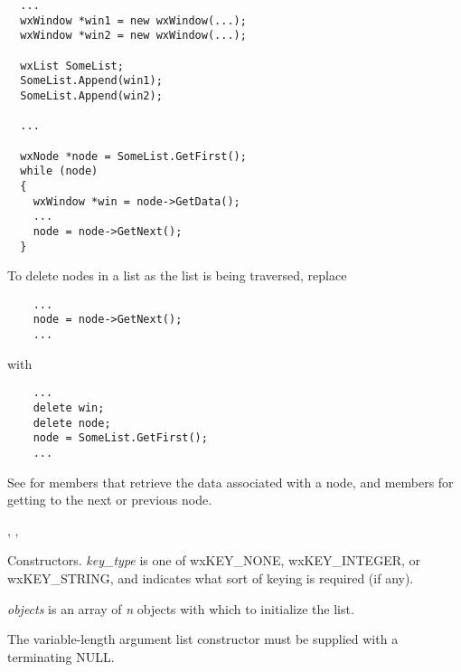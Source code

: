 \begin{verbatim}
  ...
  wxWindow *win1 = new wxWindow(...);
  wxWindow *win2 = new wxWindow(...);

  wxList SomeList;
  SomeList.Append(win1);
  SomeList.Append(win2);

  ...

  wxNode *node = SomeList.GetFirst();
  while (node)
  {
    wxWindow *win = node->GetData();
    ...
    node = node->GetNext();
  }
\end{verbatim}

To delete nodes in a list as the list is being traversed, replace

\begin{verbatim}
    ...
    node = node->GetNext();
    ...
\end{verbatim}

with

\begin{verbatim}
    ...
    delete win;
    delete node;
    node = SomeList.GetFirst();
    ...
\end{verbatim}

See  for members that retrieve the data associated with a node, and
members for getting to the next or previous node.


, ,







Constructors. {\it key\_type} is one of wxKEY\_NONE, wxKEY\_INTEGER, or wxKEY\_STRING,
and indicates what sort of keying is required (if any).

{\it objects} is an array of {\it n} objects with which to initialize the list.

The variable-length argument list constructor must be supplied with a
terminating NULL.



